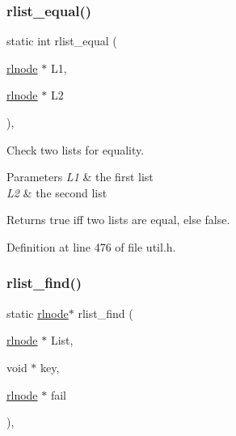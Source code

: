 \subsubsection{\texorpdfstring{rlist\+\_\+equal()}{rlist\_equal()}}
{\footnotesize\ttfamily static int rlist\+\_\+equal (\begin{DoxyParamCaption}\item[{\hyperlink{group__rlists_ga8f6244877f7ce2322c90525217ea6e7a}{rlnode} $\ast$}]{L1,  }\item[{\hyperlink{group__rlists_ga8f6244877f7ce2322c90525217ea6e7a}{rlnode} $\ast$}]{L2 }\end{DoxyParamCaption})\hspace{0.3cm}{\ttfamily [inline]}, {\ttfamily [static]}}



Check two lists for equality. 


\begin{DoxyParams}{Parameters}
{\em L1} & the first list \\
\hline
{\em L2} & the second list \\
\hline
\end{DoxyParams}
\begin{DoxyReturn}{Returns}
true iff two lists are equal, else false. 
\end{DoxyReturn}


Definition at line 476 of file util.\+h.

\mbox{\label{group__rlists_gafbb3a5edeac9f1d43130528292c47cf6}} 
\subsubsection{\texorpdfstring{rlist\+\_\+find()}{rlist\_find()}}
{\footnotesize\ttfamily static \hyperlink{group__rlists_ga8f6244877f7ce2322c90525217ea6e7a}{rlnode}$\ast$ rlist\+\_\+find (\begin{DoxyParamCaption}\item[{\hyperlink{group__rlists_ga8f6244877f7ce2322c90525217ea6e7a}{rlnode} $\ast$}]{List,  }\item[{void $\ast$}]{key,  }\item[{\hyperlink{group__rlists_ga8f6244877f7ce2322c90525217ea6e7a}{rlnode} $\ast$}]{fail }\end{DoxyParamCaption})\hspace{0.3cm}{\ttfamily [inline]}, {\ttfamily [static]}}



